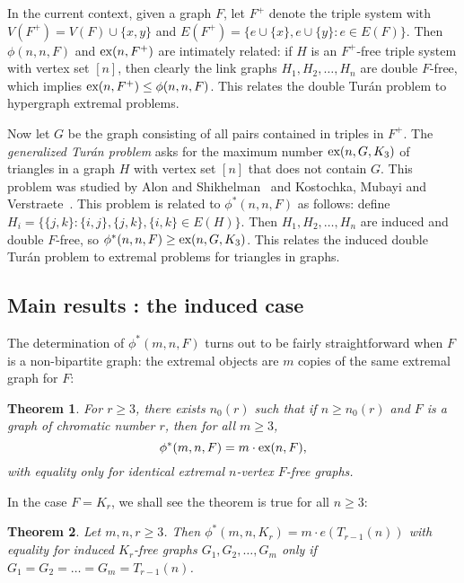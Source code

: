 \documentclass[12pt]{article}
\newtheorem{theorem}{Theorem}
\newcommand*{\ex}{\textnormal{ex}}
\begin{document}
In the current context, given a graph $F$, let $F^+$ denote the triple system with $V(F^+) = V(F) \cup \{x,y\}$ and $E(F^+) = \{e \cup \{x\},e \cup \{y\} : e \in E(F)\}$. Then $\phi(n,n,F)$ and $\ex(n,F^+)$ are intimately related: if $H$ is an $F^+$-free triple system with vertex set $[n]$, then clearly the link graphs $H_1,H_2,\dots,H_n$ are double $F$-free, which implies $\ex(n,F^+) \leq \phi(n,n,F)$. This relates the double Tur\'{a}n problem to hypergraph extremal problems.

Now let $G$ be the graph consisting of all pairs contained in triples in $F^+$. The \textit{generalized Tur\'{a}n problem} asks for the maximum number $\ex(n,G,K_3)$ of triangles in a graph $H$ with vertex set $[n]$ that does not contain $G$. This problem was studied by Alon and Shikhelman~\cite{AlonShikhelman2016} and Kostochka, Mubayi and Verstraete~\cite{KostochkaMubayiV2015,MubayiMukherjee2023,MubayiV2016}. This problem is related to $\phi^*(n,n,F)$ as follows: define $H_i = \{\{j,k\} : \{i,j\},\{j,k\},\{i,k\} \in E(H)\}$. Then $H_1,H_2,\dots,H_n$ are induced and double $F$-free, so $\phi^*(n,n,F) \geq \ex(n,G,K_3)$. This relates the induced double Tur\'{a}n problem to extremal problems for triangles in graphs.

\subsection{Main results : the induced case}

The determination of $\phi^*(m,n,F)$ turns out to be fairly straightforward when $F$ is a non-bipartite graph: the extremal objects are $m$ copies of the same extremal graph for $F$:

\begin{theorem}\label{thm:inducedF}
  For $r \geq 3$, there exists $n_0(r)$ such that if $n \geq n_0(r)$ and $F$ is a graph of chromatic number $r$, then for all $m \geq 3$,    
  \[
    \phi^*(m, n, F) = m \cdot \ex(n, F),
  \]
  with equality only for identical extremal $n$-vertex $F$-free graphs.
\end{theorem}

In the case $F = K_r$, we shall see the theorem is true for all $n \geq 3$:

\begin{theorem}\label{thm:complete}
Let $m, n, r \geq 3$. Then $\phi^*(m,n,K_{r}) = m \cdot e(T_{r - 1}(n))$ with equality for induced $K_{r}$-free graphs $G_1, G_2, \dots, G_m$ only if $G_1 = G_2 = \dots = G_m = T_{r - 1}(n)$.  
\end{theorem}
\end{document}
